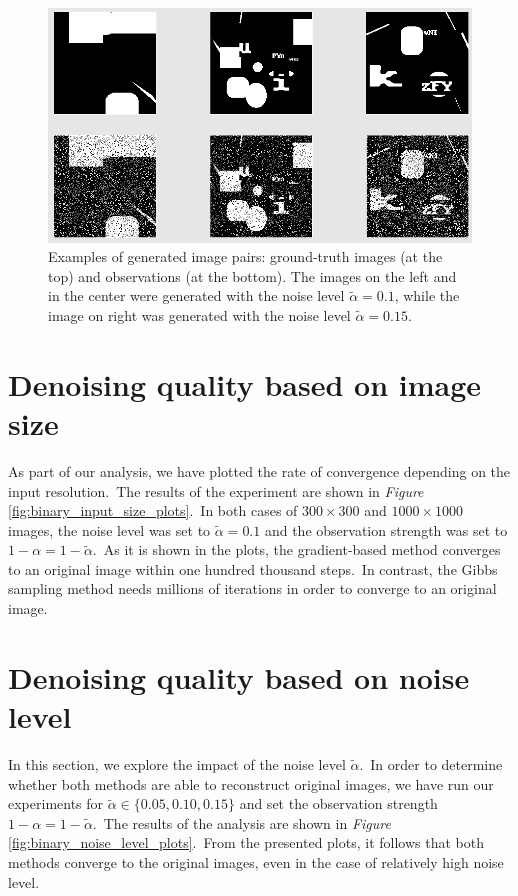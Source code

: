 \documentclass[shortabstract, english, lic]{iithesis}
\theoremstyle{default_theorem_style}\newtheorem{theorem}{Theorem}
\theoremstyle{default_theorem_style}\newtheorem{definition}{Definition}
\begin{document}
\begin{figure}[H]
\centering
\includegraphics[scale=0.475]{binary_data_examples}
\caption{Examples of generated image pairs: ground-truth images (at the top) and observations (at the bottom).
The images on the left and in the center were generated with the noise level $\tilde{\alpha} = 0.1$, while the
image on right was generated with the noise level $\tilde{\alpha} = 0.15$.}
\label{fig:binary_data_examples}
\end{figure}

\section{Denoising quality based on image size}

As part of our analysis, we have plotted the rate of convergence depending on the input resolution.\ The
results of the experiment are shown in \textit{Figure} \ref{fig:binary_input_size_plots}.\ In
both cases of $300{\times}300$ and $1000{\times}1000$ images, the noise level was set to $\tilde{\alpha} = 0.1$
and the observation strength was set to $1 - \alpha = 1 - \tilde{\alpha}$.\ As it is shown in the plots,
the gradient-based method converges to an original image within one hundred thousand steps.\ In contrast,
the Gibbs sampling method needs millions of iterations in order to converge to an original image.

\section{Denoising quality based on noise level}

In this section, we explore the impact of the noise level $\tilde{\alpha}$.\ In order to determine whether both
methods are able to reconstruct original images, we have run our experiments for
$\tilde{\alpha} \in \{0.05, 0.10, 0.15\}$ and set the observation strength $1 - \alpha = 1 - \tilde{\alpha}$.\ The
results of the analysis are shown in \textit{Figure} \ref{fig:binary_noise_level_plots}.\ From the presented
plots, it follows that both methods converge to the original images, even in the case of relatively high noise
level.\newline\newline\newline\newline
\end{document}
